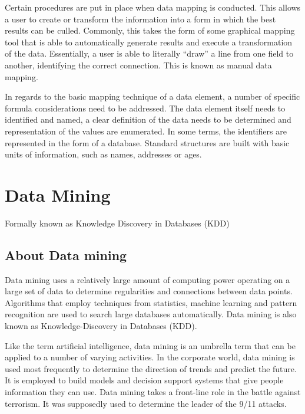 \documentclass[11pt]{article} %
\begin{document}
Certain procedures are put in place when data mapping is conducted. This allows a user to create or transform the information into a form in which the best results can be culled. Commonly, this takes the form of some graphical mapping tool that is able to automatically generate results and execute a transformation of the data. Essentially, a user is able to literally “draw” a line from one field to another, identifying the correct connection. This is known as manual data mapping.

In regards to the basic mapping technique of a data element, a number of specific formula considerations need to be addressed. The data element itself needs to identified and named, a clear definition of the data needs to be determined and representation of the values are enumerated. In some terms, the identifiers are represented in the form of a database. Standard structures are built with basic units of information, such as names, addresses or ages.
\section{Data Mining}

Formally known as Knowledge Discovery in Databases (KDD)







\subsection{About Data mining}

Data mining uses a relatively large amount of computing power operating on a large set of data to determine regularities and connections between data points. Algorithms that employ techniques from statistics, machine learning and pattern recognition are used to search large databases automatically. Data mining is also known as Knowledge-Discovery in Databases (KDD).



Like the term artificial intelligence, data mining is an umbrella term that can be applied to a number of varying activities. In the corporate world, data mining is used most frequently to determine the direction of trends and predict the future. It is employed to build models and decision support systems that give people information they can use. Data mining takes a front-line role in the battle against terrorism. It was supposedly used to determine the leader of the 9/11 attacks.
\end{document}
